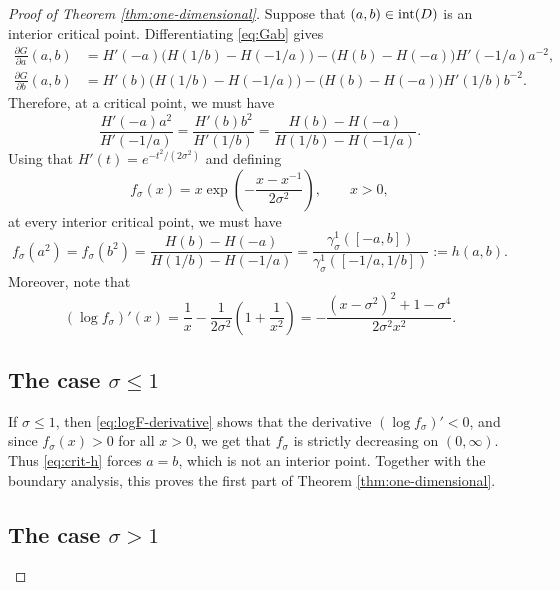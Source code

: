 \documentclass[12pt,oneside,reqno]{amsart}
\numberwithin{equation}{section}
\theoremstyle{remark}
\begin{document}
\begin{proof}[Proof of Theorem \ref{thm:one-dimensional}]
Suppose that $(a,b)\in {\rm int}(D)$ is an interior critical point. Differentiating \eqref{eq:Gab} gives
\[
\begin{aligned}
        \frac{\partial G}{\partial a}(a,b)
        &=H'(-a)\bigl(H(1/b)-H(-1/a)\bigr)
        -\bigl(H(b)-H(-a)\bigr)H'(-1/a)a^{-2}, \\
        \frac{\partial G}{\partial b}(a,b)
        &=H'(b)\bigl(H(1/b)-H(-1/a)\bigr)
        -\bigl(H(b)-H(-a)\bigr)H'(1/b)b^{-2}.
\end{aligned}
\]
Therefore, at a critical point, we must have
\[
        \frac{H'(-a)a^2}{H'(-1/a)}
        =
        \frac{H'(b)b^2}{H'(1/b)}
        =
        \frac{H(b)-H(-a)}{H(1/b)-H(-1/a)}.
\]
Using that $H'(t)=e^{-t^2/(2\sigma^2)}$ and defining
\begin{equation*}\label{eq:F-one-dim}
        f_\sigma(x)=x\exp\left(-\frac{x-x^{-1}}{2\sigma^2}\right),\qquad x>0,
\end{equation*}
at every interior critical point, we must have
\begin{equation}\label{eq:crit-h}
        f_\sigma(a^2)=f_\sigma(b^2)=\frac{H(b)-H(-a)}{H(1/b)-H(-1/a)}
        =\frac{\gamma^1_\sigma([-a,b])}{\gamma^1_\sigma([-1/a,1/b])}:=h(a,b).
\end{equation}
Moreover, note that
\begin{equation}\label{eq:logF-derivative}
        (\log f_\sigma)'(x)
        =\frac1x-\frac1{2\sigma^2}\left(1+\frac1{x^2}\right)
        =-\frac{(x-\sigma^2)^2+1-\sigma^4}{2\sigma^2x^2}.
\end{equation}

\subsection{The case \texorpdfstring{$\sigma\le1$}{sigma <= 1}}



If $\sigma\le1$, then \eqref{eq:logF-derivative} shows that the derivative $(\log f_\sigma)' <0$, and since $f_\sigma(x)> 0$ for all $x>0$, we get that $f_\sigma$ is strictly decreasing on $(0,\infty)$. Thus \eqref{eq:crit-h} forces $a=b$, which is not an interior point.   Together with the boundary analysis, this proves the first part of Theorem \ref{thm:one-dimensional}.

\subsection{The case \texorpdfstring{$\sigma>1$}{sigma > 1}}


\end{proof}
\end{document}
